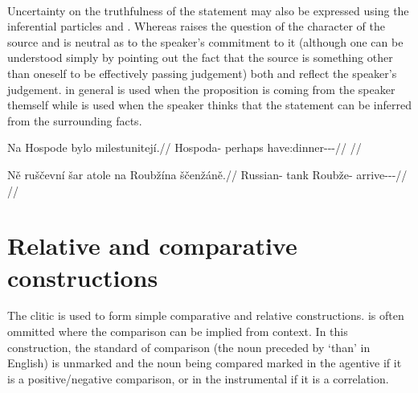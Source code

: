 \pex
{}\smallskip\\
{\footnotesize{}}
\xe

Uncertainty on the truthfulness of the statement may also be expressed using the
inferential particles  and . Whereas  raises the
question of the character of the source and is neutral as to the speaker’s
commitment to it (although one can be understood simply by pointing out the fact
that the source is something other than oneself to be effectively passing
judgement) both  and  reflect the speaker’s judgement.
 in general is used when the proposition is coming from the speaker
themself while  is used when the speaker thinks that the statement
can be inferred from the surrounding facts.

\pex
\begingl
  \gla Na Hospode bylo milestunitejí.//
  \glb \Loc{} Hospoda-\Acc{} perhaps have:dinner-\Lv{}-\SupP{}-\Quot{}//
  \glft {}//
\endgl
\xe

\pex
\begingl
  \gla Ně ruščevní šar atole na Roubžína ščenžáně.//
  \glb \Pl{} Russian-\Att{} tank \Infer{} \Loc{} Roubže-\Acc{} arrive-\Av{}-\Ret{}-\Quot{}//
  \glft {}//
\endgl
\xe

\section{Relative and comparative
constructions}\label{relativecomparative}

The clitic  is used to form simple comparative and
relative constructions.  is often ommitted where the comparison can be
implied from context. In this construction, the standard of
comparison (the noun preceded by `than' in
English) is unmarked and the noun being compared marked in the
agentive if it is a positive/negative comparison, or in the
instrumental if it is a correlation.


